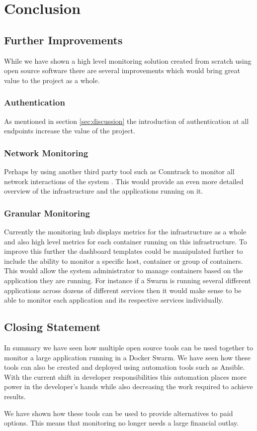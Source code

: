 \section{Conclusion}

\subsection{Further Improvements}
While we have shown a high level monitoring solution created from scratch using open source software there are several improvements which would bring great value to the project as a whole.

\subsubsection{Authentication}
As mentioned in section \ref{sec:discussion} the introduction of authentication at all endpoints increase the value of the project. 

\subsubsection{Network Monitoring}
Perhaps by using another third party tool such as Conntrack to monitor all network interactions of the system \citep{Conntrack2017}. This would provide an even more detailed overview of the infrastructure and the applications running on it.

\subsubsection{Granular Monitoring}
Currently the monitoring hub displays metrics for the infrastructure as a whole and also high level metrics for each container running on this infrastructure. To improve this further the dashboard templates could be manipulated further to include the ability to monitor a specific host, container or group of containers. This would allow the system administrator to manage containers based on the application they are running. For instance if a Swarm is running several different applications across dozens of different services then it would make sense to be able to monitor each application and its respective services individually.

\subsection{Closing Statement}
In summary we have seen how multiple open source tools can be used together to monitor a large application running in a Docker Swarm. We have seen how these tools can also be created and deployed using automation tools such as Ansible. With the current shift in developer responsibilities this automation places more power in the developer's hands while also decreasing the work required to achieve results.

We have shown how these tools can be used to provide alternatives to paid options. This means that monitoring no longer needs a large financial outlay.
